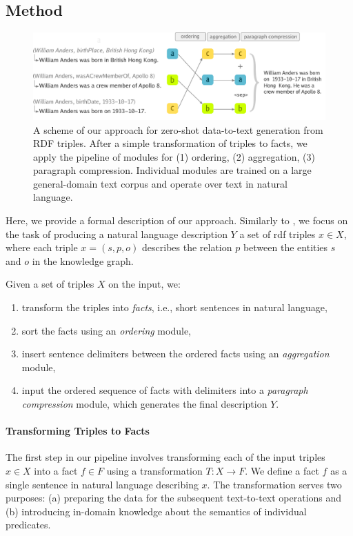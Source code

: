 \subsection{Method}
\label{sec:pipeline:method}
\begin{figure}[t]
    \centering
    \includegraphics[width=\textwidth]{img/zeroshot_pipeline.pdf}
    \caption{A scheme of our approach for zero-shot data-to-text generation from RDF triples. After a simple transformation of triples to facts, we apply the pipeline of modules for (1) ordering, (2) aggregation, (3) paragraph compression. Individual modules are trained on a large general-domain text corpus and operate over text in natural language.}\label{fig:zeroshot:pipeline}
\end{figure}
Here, we provide a formal description of our approach. Similarly to , we focus on the task of producing a natural language description $Y$ a set of \ac{rdf} triples $x \in X$, where each triple $x = (s, p, o)$ describes the relation $p$ between the entities $s$ and $o$ in the knowledge graph.

Given a set of triples $X$ on the input, we:
\begin{enumerate}
    \item transform the triples into \textit{facts}, i.e., short sentences in natural language,
    \item sort the facts using an \textit{ordering} module,
    \item insert sentence delimiters between the ordered facts using an \textit{aggregation} module,
    \item input the ordered sequence of facts with delimiters into a \textit{paragraph compression} module, which generates the final description $Y$.
\end{enumerate}

\paragraph{Transforming Triples to Facts}

The first step in our pipeline involves transforming each of the input triples $x \in X$ into a fact $f \in F$  using a transformation $T: X \rightarrow F$. We define a fact $f$ as a single sentence in natural language describing $x$.
The transformation serves two purposes: (a) preparing the data for the subsequent text-to-text operations and (b) introducing in-domain knowledge about the semantics of individual predicates.


